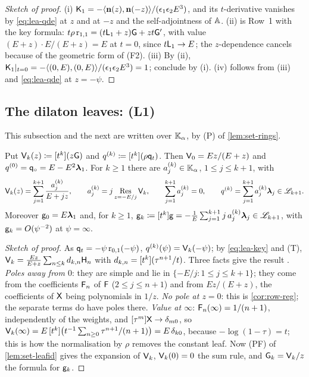 \begin{proof}[Sketch of proof]
(i) $\mathsf{K}_{1}=-\langle\mathbf{n}(z),\mathbf{n}(-z)\rangle/(\epsilon_1\epsilon_2E^3)$, and its $t$-derivative vanishes by \eqref{eq:lea-qde} at $z$ and at $-z$ and the self-adjointness of $\mathbb{A}$. (ii) is Row~1 with the key formula: $t\rho\,\mathrm{r}_{1,1}=(t\mathsf{L}_1+z)\mathsf{G}+zt\mathsf{G}'$, with value $(E+z)\cdot E/(E+z)=E$ at $t=0$, since $t\mathsf{L}_1\to E$; the $z$-dependence cancels because of the geometric form of (F2). (iii) By (ii), $\mathsf{K}_{1}|_{t=0}=-\langle(0,E),(0,E)\rangle/(\epsilon_1\epsilon_2E^3)=1$; conclude by (i). (iv) follows from (iii) and \eqref{eq:lea-qde} at $z=-\psi$.
\end{proof}

\subsection{The dilaton leaves: (L1)}
\label{sec:lea-L1}

This subsection and the next are written over $\mathbb{K}_{\alpha}$, by (P) of \cref{lem:set-rings}.

\begin{thm}
\label{thm:lea-L1}
Put $\mathsf{V}_k(z)\coloneqq[t^k](z\mathsf{G})$ and $q^{(k)}\coloneqq[t^k](\rho\mathsf{q}_{t})$. Then $\mathsf{V}_0=Ez/(E+z)$ and $q^{(0)}=\mathsf{q}_{\circ}=E-E^2\boldsymbol{\lambda}_1$. For $k\geq1$ there are $a^{(k)}_j\in\mathbb{K}_{\alpha}$, $1\leq j\leq k+1$, with
\[
\mathsf{V}_k(z)=\sum_{j=1}^{k+1}\frac{a_j^{(k)}}{E+jz},\qquad a_j^{(k)}=j\operatorname*{Res}_{z=-E/j}\mathsf{V}_k,\qquad \sum_{j=1}^{k+1}a_j^{(k)}=0,\qquad
q^{(k)}=\sum_{j=1}^{k+1}a_j^{(k)}\boldsymbol{\lambda}_j\in\mathscr{L}_{k+1}.
\]
Moreover $\mathsf{g}_0=E\boldsymbol{\lambda}_1$ and, for $k\geq1$, $\mathsf{g}_k\coloneqq[t^k]\mathsf{g}=-\frac1E\sum_{j=1}^{k+1}j\,a_j^{(k)}\boldsymbol{\lambda}_j\in\mathscr{L}_{k+1}$, with $\mathsf{g}_k=O(\psi^{-2})$ at $\psi=\infty$.
\end{thm}

\begin{proof}[Sketch of proof]
As $\mathsf{q}_{t}=-\psi\,\mathrm{r}_{0,1}(-\psi)$, $q^{(k)}(\psi)=\mathsf{V}_k(-\psi)$; by \eqref{eq:lea-key} and (T), $\mathsf{V}_k=\frac{Ez}{E+z}\sum_{n\leq k}d_{k,n}\mathsf{H}_n$ with $d_{k,n}=[t^k](\tau^{n+1}/t)$. Three facts give the result . \emph{Poles away from $0$}: they are simple and lie in $\{-E/j:1\leq j\leq k+1\}$; they come from the coefficients $\mathsf{F}_n$ of $\mathsf{F}$ ($2\leq j\leq n+1$) and from $Ez/(E+z)$, the coefficients of $\mathsf{X}$ being polynomials in $1/z$. \emph{No pole at $z=0$}: this is \cref{cor:row-reg}; the separate terms do have poles there. \emph{Value at $\infty$}: $\mathsf{F}_n(\infty)=1/(n+1)$, independently of the weights, and $[\tau^m]\mathsf{X}\to\delta_{m0}$, so $\mathsf{V}_k(\infty)=E\,[t^k]\big(t^{-1}\sum_{n\geq0}\tau^{n+1}/(n+1)\big)=E\,\delta_{k0}$, because $-\log(1-\tau)=t$; this is how the normalisation by $\rho$ removes the constant leaf. Now (PF) of \cref{lem:set-leafid} gives the expansion of $\mathsf{V}_k$, $\mathsf{V}_k(0)=0$ the sum rule, and $\mathsf{G}_k=\mathsf{V}_k/z$ the formula for $\mathsf{g}_k$.
\end{proof}

